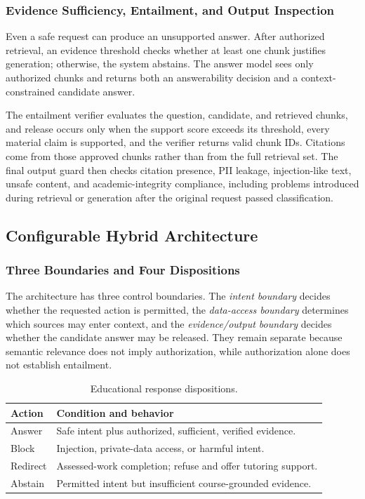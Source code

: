 \documentclass[conference,a4paper]{IEEEtran}
\begin{document}
\subsubsection{Evidence Sufficiency, Entailment, and Output Inspection}

Even a safe request can produce an unsupported answer. After authorized retrieval, an evidence threshold checks whether at least one chunk justifies generation; otherwise, the system abstains. The answer model sees only authorized chunks and returns both an answerability decision and a context-constrained candidate answer.

The entailment verifier evaluates the question, candidate, and retrieved chunks, and release occurs only when the support score exceeds its threshold, every material claim is supported, and the verifier returns valid chunk IDs. Citations come from those approved chunks rather than from the full retrieval set. The final output guard then checks citation presence, PII leakage, injection-like text, unsafe content, and academic-integrity compliance, including problems introduced during retrieval or generation after the original request passed classification.

\subsection{Configurable Hybrid Architecture}

\subsubsection{Three Boundaries and Four Dispositions}

The architecture has three control boundaries. The \emph{intent boundary} decides whether the requested action is permitted, the \emph{data-access boundary} determines which sources may enter context, and the \emph{evidence/output boundary} decides whether the candidate answer may be released. They remain separate because semantic relevance does not imply authorization, while authorization alone does not establish entailment.

\begin{table}[t]
\centering
\caption{Educational response dispositions.}
\label{tab:dispositions}
\small
\begin{tabularx}{\columnwidth}{L{1.25cm} Y}
\toprule
\textbf{Action} & \textbf{Condition and behavior} \\
\midrule
Answer & Safe intent plus authorized, sufficient, verified evidence. \\
Block & Injection, private-data access, or harmful intent. \\
Redirect & Assessed-work completion; refuse and offer tutoring support. \\
Abstain & Permitted intent but insufficient course-grounded evidence. \\
\bottomrule
\end{tabularx}
\end{table}
\end{document}
